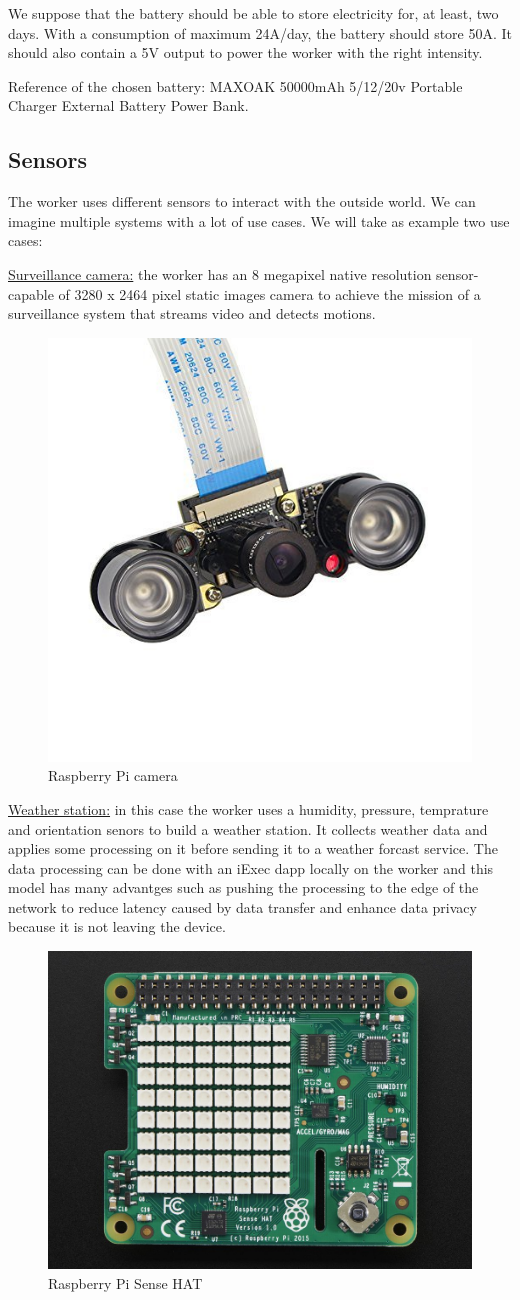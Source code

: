         We suppose that the battery should be able to store electricity for, at least, two days. With a
        consumption of maximum 24A/day, the battery should store 50A. It should also contain a 5V output
        to power the worker with the right intensity.

        Reference of the chosen battery: MAXOAK 50000mAh 5/12/20v Portable Charger External Battery Power Bank.

    \subsection{Sensors}
        The worker uses different sensors to interact with the outside world. We can imagine multiple systems
        with a lot of use cases. We will take as example two use cases:

        \underline{Surveillance camera:} the worker has an 8 megapixel native resolution sensor-capable of 3280 x 2464
        pixel static images camera to achieve the mission of a surveillance system that streams video and detects motions.

        \begin{figure}[!h]\centering
            \includegraphics[width=.2\columnwidth]{5-Design/figs/camera.jpg}
            \caption{Raspberry Pi camera}
        \end{figure}


        \underline{Weather station:} in this case the worker uses a humidity, pressure, temprature and
        orientation senors to build a weather station. It collects weather data and applies some
        processing on it before sending it to a weather forcast service. The data processing can be done
        with an iExec dapp locally on the worker and this model has many advantges such as pushing the
        processing to the edge of the network to reduce latency caused by data transfer and enhance data
        privacy because it is not leaving the device.

        \begin{figure}[!h]\centering
            \includegraphics[width=.3\columnwidth]{5-Design/figs/sense-hat.jpg}
            \caption{Raspberry Pi Sense HAT}
        \end{figure}


